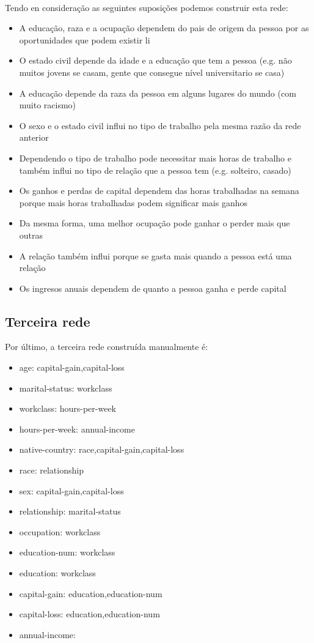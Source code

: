 	\\
	Tendo en consideração as seguintes suposições podemos construir esta rede:
	\begin{itemize}
		\item A educação, raza e a ocupação dependem do pais de origem da pessoa por as oportunidades que podem existir li
		\item O estado civil depende da idade e a educação que tem a pessoa (e.g. não muitos jovens se casam, gente que consegue nível universitario se casa)
		\item A educação depende da raza da pessoa em alguns lugares do mundo (com muito racismo)
		\item O sexo e o estado civil influi no tipo de trabalho pela mesma razão da rede anterior
		\item Dependendo o tipo de trabalho pode necessitar mais horas de trabalho e também influi no tipo de relação que a pessoa tem (e.g. solteiro, casado)
		\item Os ganhos e perdas de capital dependem das horas trabalhadas na semana porque mais horas trabalhadas podem significar mais ganhos
		\item Da mesma forma, uma melhor ocupação pode ganhar o perder mais que outras
		\item A relação também influi porque se gasta mais quando a pessoa está uma relação
		\item Os ingresos anuais dependem de quanto a pessoa ganha e perde capital
	\end{itemize}

\subsection{Terceira rede}
	Por último, a terceira rede construída manualmente é:
	\begin{itemize}
		\item age: capital-gain,capital-loss
		\item marital-status: workclass
		\item workclass: hours-per-week
		\item hours-per-week: annual-income
		\item native-country: race,capital-gain,capital-loss
		\item race: relationship
		\item sex: capital-gain,capital-loss
		\item relationship: marital-status
		\item occupation: workclass
		\item education-num: workclass
		\item education: workclass
		\item capital-gain: education,education-num
		\item capital-loss: education,education-num
		\item annual-income:
	\end{itemize}
	
